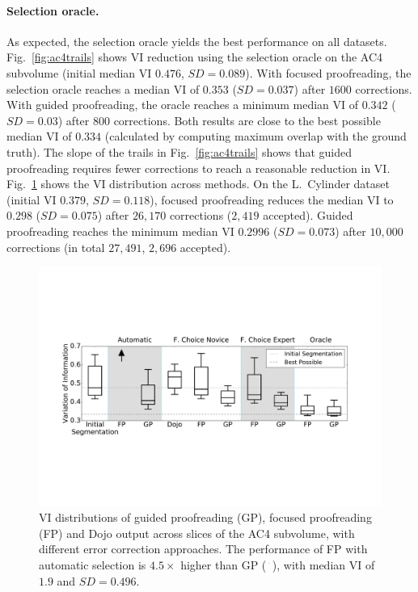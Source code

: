 \paragraph{Selection oracle.} As expected, the selection oracle yields the best performance on all datasets. Fig.~\ref{fig:ac4trails} shows VI reduction using the selection oracle on the AC4 subvolume (initial median VI $0.476$, $SD=0.089$). With focused proofreading, the selection oracle reaches a median VI of $0.353$ ($SD=0.037$) after $1600$ corrections. With guided proofreading, the oracle reaches a minimum median VI of $0.342$ ($SD=0.03$) after $800$ corrections. Both results are close to the best possible median VI of $0.334$ (calculated by computing maximum overlap with the ground truth). The slope of the trails in Fig.~\ref{fig:ac4trails} shows that guided proofreading requires fewer corrections to reach a reasonable reduction in VI. Fig.~\ref{fig:ac4boxplot} shows the VI distribution across methods. On the L.~Cylinder dataset (initial VI $0.379$, $SD=0.118$), focused proofreading reduces the median VI to $0.298$ ($SD=0.075$) after $26,170$ corrections ($2,419$ accepted). Guided proofreading reaches the minimum median VI $0.2996$ ($SD=0.073$) after $10,000$ corrections (in total $27,491$, $2,696$ accepted).

\vspace{-4mm}

\begin{figure}[t]
\centering
\includegraphics[width=\linewidth]{gfx/ac4boxplot.pdf}
\caption{VI distributions of guided proofreading (GP), focused proofreading (FP) and Dojo output across slices of the AC4 subvolume, with different error correction approaches. The performance of FP with automatic selection is $4.5\times$ higher than GP (\protect\includegraphics[width=0.2cm]{gfx/arrow.pdf}), with median VI of $1.9$ and $SD=0.496$.}
\label{fig:ac4boxplot}
\vspace{-4mm}
\end{figure}

